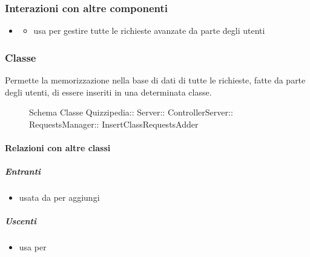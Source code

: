 \subsubsection{Interazioni con altre componenti}
\begin{itemize}
\item {}
\begin{itemize}
\item usa  per gestire tutte le richieste avanzate da parte degli utenti
\end{itemize}
\end{itemize}
\subsubsection{Classe }
Permette la memorizzazione nella base di dati di tutte le richieste, fatte da parte degli utenti, di essere inseriti in una determinata classe.
\begin{figure}[H]
\centering
\noindent{}
\caption[Schema Classe InsertClassRequestsAdder]{Schema Classe Quizzipedia:: Server:: ControllerServer:: RequestsManager:: InsertClassRequestsAdder}
\end{figure}
\paragraph{Relazioni con altre classi}
\subparagraph{Entranti}
\begin{itemize}
\item usata da  per aggiungi
\end{itemize}
\subparagraph{Uscenti}
\begin{itemize}
\item usa  per 
\end{itemize}
